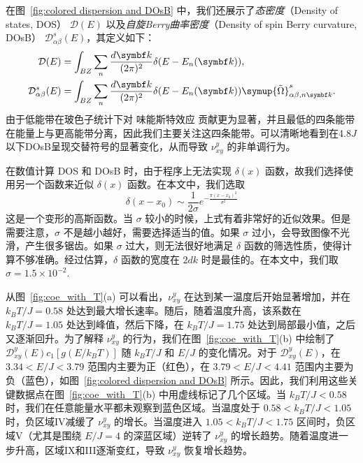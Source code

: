         在图~\ref{fig:colored dispersion and DOsB} 中，我们还展示了\emph{态密度}（Density of states, DOS） $\mathcal{D}(E)$ 以及\emph{自旋Berry曲率密度}（Density of spin Berry curvature, DOsB） $\mathcal{D}^s_{\alpha\beta}(E)$，其定义如下：
        \begin{align}
            \mathcal{D}(E)&= \int_{BZ} \sum_n \frac{d{\bm{k}}}{(2\pi)^2} \delta(E - E_n({\bm{k}})),\\
            \mathcal{D}^s_{\alpha\beta}(E)&= \int_{BZ} \sum_n \frac{d{\bm{k}}}{(2\pi)^2} \delta(E - E_n({\bm{k}})) \symup{\tilde{\Omega}}^s_{\alpha\beta,n{\bm{k}}}.
        \end{align}
        由于低能带在玻色子统计下对 味能斯特效应 贡献更为显著，并且最低的四条能带在能量上与更高能带分离，因此我们主要关注这四条能带。可以清晰地看到在4.8$J$以下DOsB呈现交替符号的显著变化，从而导致 $\nu^y_{xy}$ 的非单调行为。
        
        在数值计算 DOS 和 DOsB 时，由于程序上无法实现 $\delta(x)$ 函数，故我们选择使用另一个函数来近似 $\delta(x)$ 函数。在本文中，我们选取
        \begin{equation}
            \delta(x-x_0) \sim \frac{1}{2\sigma } e^{-\frac{\pi ( x-x_{0})^{2}}{\sigma ^{2}}}
        \end{equation}
        这是一个变形的高斯函数。当 $\sigma$ 较小的时候，上式有着非常好的近似效果。但是需要注意，$\sigma$ 不是越小越好，需要选择适当的值。如果 $\sigma$ 过小，会导致图像不光滑，产生很多锯齿。如果 $\sigma$ 过大，则无法很好地满足 $\delta$ 函数的筛选性质，使得计算不够准确。经过估算，$\delta$ 函数的宽度在 $2dk$ 时是最佳的。在本文中，我们取 $\sigma = 1.5 \times 10^{-2}$.

        从图~\ref{fig:coe_with_T}(a) 可以看出，$\nu^y_{xy}$ 在达到某一温度后开始显著增加，并在 $k_B T/J=0.58$ 处达到最大增长速率。随后，随着温度升高，该系数在 $k_B T/J=1.05$ 处达到峰值，然后下降，在 $k_B T/J=1.75$ 处达到局部最小值，之后又逐渐回升。为了解释 $\nu^y_{xy}$ 的行为，我们在图~\ref{fig:coe_with_T}(b) 中绘制了 $\mathcal{D}^y_{xy}(E) c_1[g(E/k_B T)]$ 随 $k_B T/J$ 和 $E/J$ 的变化情况。对于 $\mathcal{D}^y_{xy}(E)$，在 $3.34 <E/J <3.79$ 范围内主要为正（红色），在 $3.79< E/J <4.41$ 范围内主要为负（蓝色），如图~\ref{fig:colored dispersion and DOsB} 所示。因此，我们利用这些关键数据点在图~\ref{fig:coe_with_T}(b) 中用虚线标记了几个区域。当 $k_B T/J<0.58$ 时，我们在任意能量水平都未观察到蓝色区域。当温度处于 $0.58< k_B T/J <1.05$ 时，负区域IV减缓了 $\nu^y_{xy}$ 的增长。当温度进入 $1.05< k_B T/J <1.75$ 区间时，负区域V（尤其是围绕 $E/J=4$ 的深蓝区域）逆转了 $\nu^y_{xy}$ 的增长趋势。随着温度进一步升高，区域IX和III逐渐变红，导致 $\nu^y_{xy}$ 恢复增长趋势。

